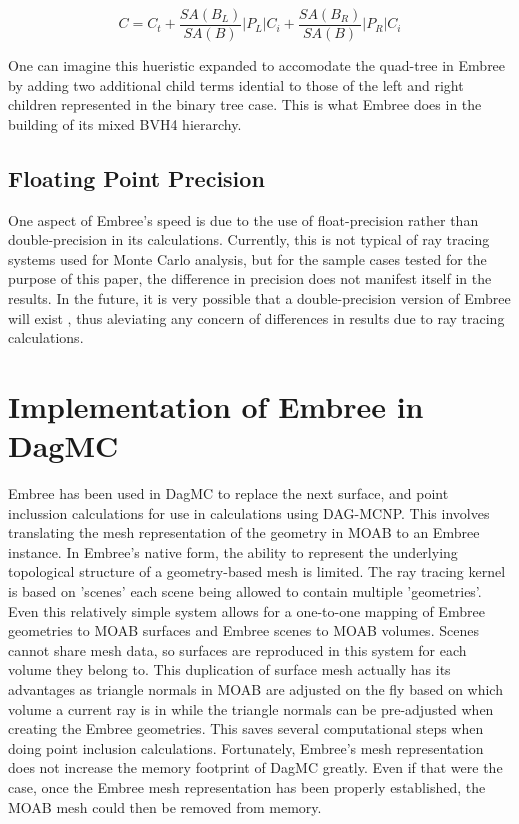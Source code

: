 \documentclass{anstrans}
\begin{document}
\begin{equation} 
C = C_{t} + \frac{SA(B_{L})}{SA(B)} |P_{L}|C_{i} +  \frac{SA(B_{R})}{SA(B)} |P_{R}|C_{i}
\end{equation}

One can imagine this hueristic expanded to accomodate the quad-tree in Embree by adding two additional child terms idential to those of the left and right children represented in the binary tree case. This is what Embree does in the building of its mixed BVH4 hierarchy. 

\subsection{Floating Point Precision}

One aspect of Embree's speed is due to the use of float-precision rather than double-precision in its calculations. Currently, this is not typical of ray tracing systems used for Monte Carlo analysis, but for the sample cases tested for the purpose of this paper, the difference in precision does not manifest itself in the results. In the future, it is very possible that a double-precision version of Embree will exist \cite{gpu_mic_ray_tracing_rpi}, thus aleviating any concern of differences in results due to ray tracing calculations.

\section{Implementation of Embree in DagMC}

Embree has been used in DagMC to replace the next surface, and point inclussion calculations for use in calculations using DAG-MCNP. This involves translating the mesh representation of the geometry in MOAB to an Embree instance. In Embree's native form, the ability to represent the underlying topological structure of a geometry-based mesh is limited. The ray tracing kernel is based on 'scenes' each scene being allowed to contain multiple 'geometries'. Even this relatively simple system allows for a one-to-one mapping of Embree geometries to MOAB surfaces and Embree scenes to MOAB volumes. Scenes cannot share mesh data, so surfaces are reproduced in this system for each volume they belong to. This duplication of surface mesh actually has its advantages as triangle normals in MOAB are adjusted on the fly based on which volume a current ray is in while the triangle normals can be pre-adjusted when creating the Embree geometries. This saves several computational steps when doing point inclusion calculations. Fortunately, Embree's mesh representation does not increase the memory footprint of DagMC greatly. Even if that were the case, once the Embree mesh representation has been properly established, the MOAB mesh could then be removed from memory.
\end{document}
